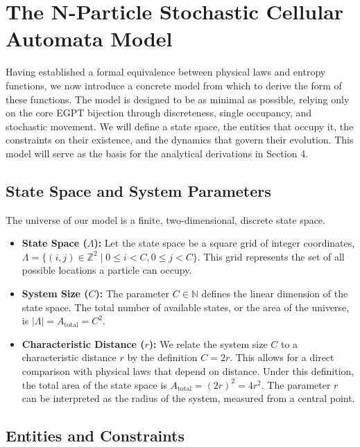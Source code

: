 \documentclass[11pt, letterpaper]{article}
\begin{document}
\section{The N-Particle Stochastic Cellular Automata Model}

Having established a formal equivalence between physical laws and entropy functions, we now introduce a concrete model from which to derive the form of these functions. The model is designed to be as minimal as possible, relying only on the core EGPT bijection through discreteness, single occupancy, and stochastic movement. We will define a state space, the entities that occupy it, the constraints on their existence, and the dynamics that govern their evolution. This model will serve as the basis for the analytical derivations in Section 4.

\subsection{State Space and System Parameters}

The universe of our model is a finite, two-dimensional, discrete state space.

\begin{itemize}
    \item \textbf{State Space ($\Lambda$):} Let the state space be a square grid of integer coordinates, $\Lambda = \{ (i,j) \in \mathbb{Z}^2 \mid 0 \le i < C, 0 \le j < C \}$. This grid represents the set of all possible locations a particle can occupy.

    \item \textbf{System Size ($C$):} The parameter $C \in \mathbb{N}$ defines the linear dimension of the state space. The total number of available states, or the area of the universe, is $|\Lambda| = A_{\text{total}} = C^2$.

    \item \textbf{Characteristic Distance ($r$):} We relate the system size $C$ to a characteristic distance $r$ by the definition $C = 2r$. This allows for a direct comparison with physical laws that depend on distance. Under this definition, the total area of the state space is $A_{\text{total}} = (2r)^2 = 4r^2$. The parameter $r$ can be interpreted as the radius of the system, measured from a central point.
\end{itemize}

\subsection{Entities and Constraints}
\end{document}

